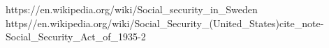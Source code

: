 \documentclass[11pt]{report}
\numberwithin{equation}{section} %
\numberwithin{figure}{section} %
\begin{document}
% 

\begin{large}
\tableofcontents
\end{large}

\newpage



% 

\newpage



\newpage



\newpage

% 

\newpage

% 

\newpage

%

\newpage

\begin{thebibliography}{10} %

https://en.wikipedia.org/wiki/Social\_security\_in\_Sweden
https//en.wikipedia.org/wiki/Social\_Security\_(United\_States)cite\_note-Social\_Security\_Act\_of\_1935-2


\end{thebibliography}
\end{document}
